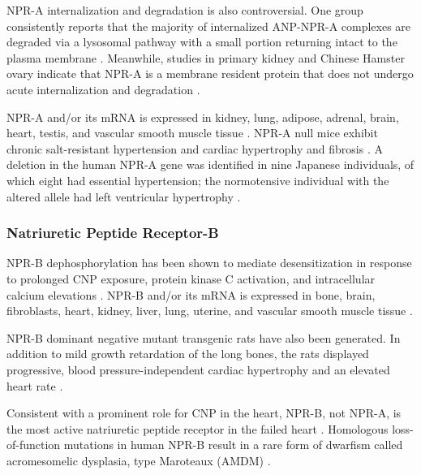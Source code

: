 \documentclass[14pt,a4paper,onecolumn]{extarticle}
\begin{document}
NPR-A internalization and degradation is also controversial. One group consistently reports that the majority of internalized ANP-NPR-A complexes are degraded via a lysosomal pathway with a small portion returning intact to the plasma membrane \citep{Pandey2002}. Meanwhile, studies in primary kidney and Chinese Hamster ovary indicate that NPR-A is a membrane resident protein that does not undergo acute internalization and degradation \citep{Fan2005} \citep{Vieira2001}. %



NPR-A and/or its mRNA is expressed in kidney, lung, adipose, adrenal, brain, heart, testis, and vascular smooth muscle tissue \citep{Goy2001}. NPR-A null mice exhibit chronic salt-resistant hypertension and cardiac hypertrophy and fibrosis \citep{Kuhn2002}.  A deletion in the human NPR-A gene was identified in nine Japanese individuals, of which eight had essential hypertension; the normotensive individual with the altered allele had left ventricular hypertrophy \citep{Nakayama2000}. %



\subsubsection{Natriuretic Peptide Receptor-B}



NPR-B dephosphorylation has been shown to mediate desensitization in response to prolonged CNP exposure, protein kinase C activation, and intracellular calcium elevations \citep{Potter2000} \citep{Potthast2004}. NPR-B and/or its mRNA is expressed in bone, brain, fibroblasts, heart, kidney, liver, lung, uterine, and vascular smooth muscle tissue \citep{Bryan2006} \citep{Dickey2007}. %



NPR-B dominant negative mutant transgenic rats have also been generated. In addition to mild growth retardation of the long bones, the rats displayed progressive, blood pressure-independent cardiac hypertrophy and an elevated heart rate \citep{Langenickel2006}. %



Consistent with a prominent role for CNP in the heart, NPR-B, not NPR-A, is the most active natriuretic peptide receptor in the failed heart \citep{Dickey2007}. Homologous loss-of-function mutations in human NPR-B result in a rare form of dwarfism called acromesomelic dysplasia, type Maroteaux (AMDM) \citep{Bartels2004}. %
\end{document}
